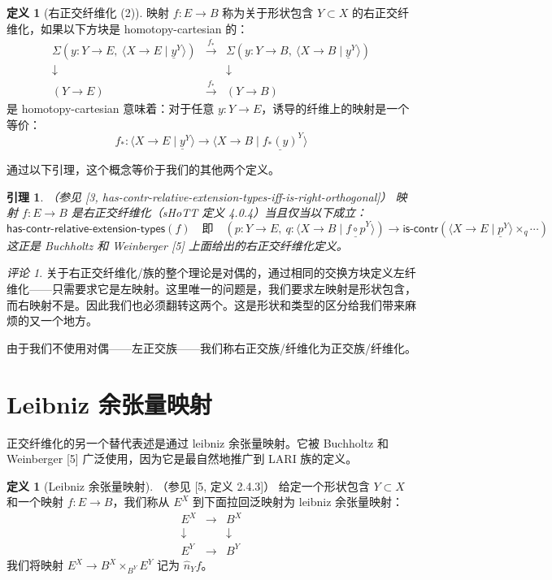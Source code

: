 \documentclass{ctexrep}
\theoremstyle{plain}
\newtheorem{lemma}[theorem]{引理}
\theoremstyle{definition}
\newtheorem{definition}[theorem]{定义}
\theoremstyle{remark}
\newtheorem{remark}[theorem]{评论}
\theoremstyle{definition}
\theoremstyle{definition}
\theoremstyle{definition}
\newcommand{\iscontr}{\mathsf{is\text{-}contr}}
\begin{document}
\begin{definition}[右正交纤维化 (2)]
映射 $f:E\to B$ 称为关于形状包含 $Y\subset X$ 的右正交纤维化，如果以下方块是 homotopy-cartesian 的：
\[
\begin{array}{ccc}
\Sigma(y:Y\to E,\ \langle X\to E \mid \underline{y}^{Y} \rangle) & \xrightarrow{f_*} & \Sigma(y:Y\to B,\ \langle X\to B \mid \underline{y}^{Y} \rangle) \\
\downarrow & & \downarrow \\
(Y\to E) & \xrightarrow{f_*} & (Y\to B)
\end{array}
\]
是 homotopy-cartesian 意味着：对于任意 $y:Y\to E$，诱导的纤维上的映射是一个等价：
\[
f_* : \langle X\to E \mid \underline{y}^{Y} \rangle \to \langle X\to B \mid \underline{f_*(y)}^{Y} \rangle
\]
\end{definition}

通过以下引理，这个概念等价于我们的其他两个定义。

\begin{lemma}（参见 [3, has-contr-relative-extension-types-iff-is-right-orthogonal]）
映射 $f:E\to B$ 是右正交纤维化（sHoTT 定义 4.0.4）当且仅当以下成立：
\[
\mathsf{has\text{-}contr\text{-}relative\text{-}extension\text{-}types}(f) \quad\text{即}\quad
\left(p:Y\to E,\ q:\langle X\to B \mid \underline{f\circ p}^{Y} \rangle\right) \to \iscontr\left(\langle X\to E \mid \underline{p}^{Y} \rangle \times_{q} \cdots\right)
\]
这正是 Buchholtz 和 Weinberger [5] 上面给出的右正交纤维化定义。
\end{lemma}

\begin{remark}
关于右正交纤维化/族的整个理论是对偶的，通过相同的交换方块定义左纤维化——只需要求它是左映射。这里唯一的问题是，我们要求左映射是形状包含，而右映射不是。因此我们也必须翻转这两个。这是形状和类型的区分给我们带来麻烦的又一个地方。

由于我们不使用对偶——左正交族——我们称右正交族/纤维化为正交族/纤维化。
\end{remark}

\section{Leibniz 余张量映射}

正交纤维化的另一个替代表述是通过 leibniz 余张量映射。它被 Buchholtz 和 Weinberger [5] 广泛使用，因为它是最自然地推广到 LARI 族的定义。

\begin{definition}[Leibniz 余张量映射]（参见 [5, 定义 2.4.3]）
给定一个形状包含 $Y\subset X$ 和一个映射 $f:E\to B$，我们称从 $E^X$ 到下面拉回泛映射为 leibniz 余张量映射：
\[
\begin{array}{ccc}
E^X & \to & B^X \\
\downarrow & & \downarrow \\
E^Y & \to & B^Y
\end{array}
\]
我们将映射 $E^X \to B^X \times_{B^Y} E^Y$ 记为 $\widehat{n}_Y f$。
\end{definition}
\end{document}

